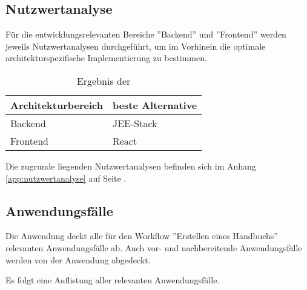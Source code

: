\documentclass[12pt, xcolor=dvipsnames]{scrartcl}
\begin{document}
\subsection{Nutzwertanalyse}
\label{sec:nutzwertanalyse}

Für die entwicklungsrelevanten Bereiche ''Backend'' und ''Frontend'' werden jeweils Nutzwertanalysen durchgeführt, um im Vorhinein die optimale architekturspezifische Implementierung zu bestimmen.

\begin{table}[H]
	\centering
	\begin{tabular}{ll}

		\rowcolor{white!15}				
		\textbf{Architekturbereich} & \textbf{beste Alternative} \\\hline		
				
		Backend & JEE-Stack \\
		Frontend & React	\\	
			    
	\end{tabular}
	\caption{Ergebnis der }
	\label{tab:nutzwertanalyse}
\end{table}

Die zugrunde liegenden Nutzwertanalysen befinden sich im Anhang \ref{app:nutzwertanalyse} auf Seite \pageref{app:nutzwertanalyse}.

\subsection{Anwendungsfälle}

Die Anwendung deckt alle für den Workflow ''Erstellen eines Handbuchs'' relevanten Anwendungsfälle ab. Auch vor- und nachbereitende Anwendungsfälle werden von der Anwendung abgedeckt.

Es folgt eine Auflistung aller relevanten Anwendungsfälle.
\end{document}
